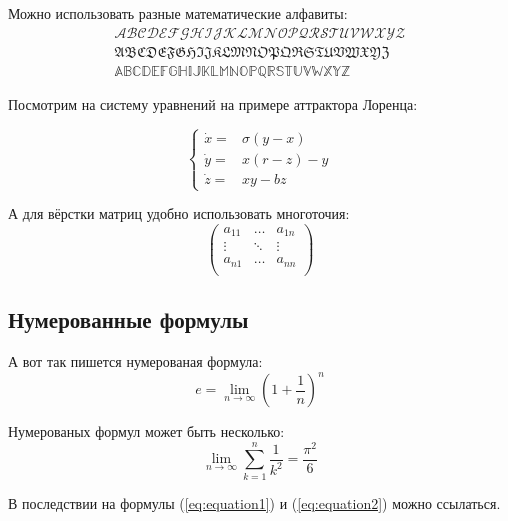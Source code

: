 Можно использовать разные математические алфавиты:
\begin{eqnarray}
\mathcal{ABCDEFGHIJKLMNOPQRSTUVWXYZ} \nonumber \\
\mathfrak{ABCDEFGHIJKLMNOPQRSTUVWXYZ} \nonumber \\
\mathbb{ABCDEFGHIJKLMNOPQRSTUVWXYZ} \nonumber
\end{eqnarray}

Посмотрим на систему уравнений на примере аттрактора Лоренца:

$$
\left\{
  \begin{array}{rl}
    \dot x = & \sigma (y-x) \\
    \dot y = & x (r - z) - y \\
    \dot z = & xy - bz
  \end{array}
\right.
$$

А для вёрстки матриц удобно использовать многоточия:
$$
\left(
  \begin{array}{ccc}
  	a_{11} & \ldots & a_{1n} \\
  	\vdots & \ddots & \vdots \\
  	a_{n1} & \ldots & a_{nn} \\
  \end{array}
\right)
$$


\subsection{Нумерованные формулы} \label{subsect1_3_3}

А вот так пишется нумерованая формула:
\begin{equation}
  \label{eq:equation1}
  e = \lim_{n \to \infty} \left( 1+\frac{1}{n} \right) ^n
\end{equation}

Нумерованых формул может быть несколько:
\begin{equation}
  \label{eq:equation2}
  \lim_{n \to \infty} \sum_{k=1}^n \frac{1}{k^2} = \frac{\pi^2}{6}
\end{equation}

В последствии на формулы (\ref{eq:equation1}) и (\ref{eq:equation2}) можно ссылаться.


\clearpage